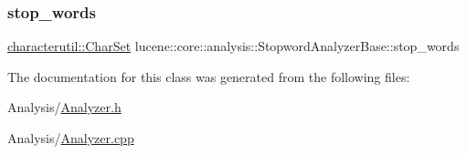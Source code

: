 \subsubsection{\texorpdfstring{stop\+\_\+words}{stop\_words}}
{\footnotesize\ttfamily \mbox{\hyperlink{classlucene_1_1core_1_1analysis_1_1characterutil_1_1CharSet}{characterutil\+::\+Char\+Set}} lucene\+::core\+::analysis\+::\+Stopword\+Analyzer\+Base\+::stop\+\_\+words\hspace{0.3cm}{\ttfamily [protected]}}



The documentation for this class was generated from the following files\+:\begin{DoxyCompactItemize}
\item 
Analysis/\mbox{\hyperlink{Analyzer_8h}{Analyzer.\+h}}\item 
Analysis/\mbox{\hyperlink{Analyzer_8cpp}{Analyzer.\+cpp}}\end{DoxyCompactItemize}
